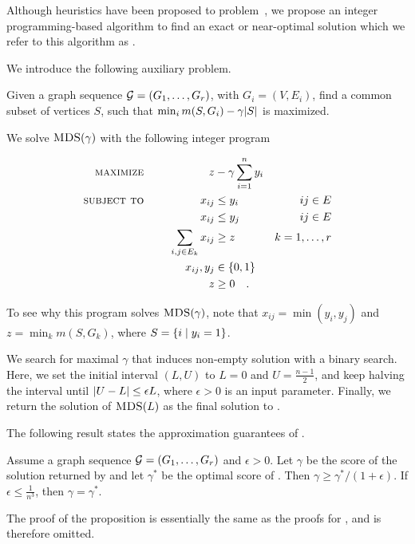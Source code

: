 Although heuristics have been proposed to  \problemdcs problem~\cite{jethava2015finding, semertzidis2019finding}, we propose an integer programming-based algorithm to find an exact or near-optimal solution which we refer to this algorithm as \algipdcs. 

We introduce the following auxiliary problem.

\begin{problem}[$\problemdcs(\gamma)$]
Given a graph sequence ${\mathcal G} = (G_1,\dots,G_r)$, with  $G_i = (V, E_i)$, find a common subset of vertices
$S$, 
such that $\min_i m(S, G_i) - \gamma {\left|S\right|}$  is maximized.
\end{problem}


We solve $\problemdcs(\gamma)$ with the following integer program

\begin{align*}	\textsc{maximize\,\,\,\,}\hspace{.1in}&&\hspace{.05in}  z &- \gamma \sum_{i = 1}^{n} y_i 
	\\  
	\textsc{subject to}\hspace{.2in} && 
  x_{ij} &\leq y_i &  ij \in E \\
	&& x_{ij} &\leq y_j & ij \in E \\ 
 	&& \sum_{ i, j \in E_k} x_{ij} &\geq z  &  k = 1,\dots, r \\
	&& x_{ij}, y_j &\in \{0,1\}\\
        &&  z & \geq 0 \quad.
\end{align*}

To see why this program solves $\problemdcs(\gamma)$,
note that $x_{ij} = \min(y_i, y_j)$ and $z = \min_k m(S, G_k)$,
where $S = \left\{i \mid y_i = 1\right\}$.

We search for maximal $\gamma$ that induces non-empty solution
with a binary search. Here, we set the initial interval $(L, U)$ to $L = 0$ and $U =\frac{n - 1}{2}$, and keep halving the interval until ${\left| U - L\right|} \leq  \epsilon L$, where $\epsilon > 0$  is an input parameter. Finally, we return the solution of $\textsc{MDS}(L)$ as the final solution to \problemdcs. 

The following result states the approximation guarantees of \algipdcs.

\begin{proposition}
Assume a graph sequence ${\mathcal G} = (G_1,\dots,G_r)$ and $\epsilon > 0$. 
Let $\gamma$ be the score of the solution returned by \algipdcs and let $\gamma^*$ be the optimal score of \problemdcs. Then $\gamma \geq \gamma^*/(1 + \epsilon)$. If $\epsilon \leq \frac{1}{n^3}$, then $\gamma = \gamma^*$.
\label{prop:opt-dcs-approx}
\end{proposition}

The proof of the proposition is essentially the same as the proofs for \algipcm, and is therefore omitted.




























